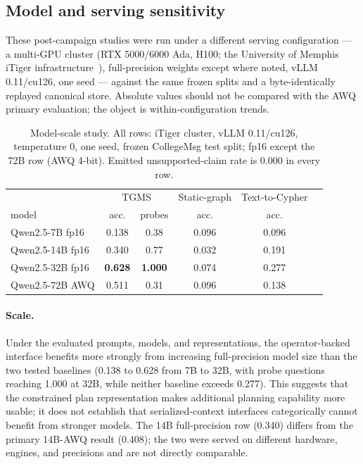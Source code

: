 \documentclass[11pt]{article}
\begin{document}
\subsection{Model and serving sensitivity}
\label{sec:sensitivity}
These post-campaign studies were run under a different serving
configuration --- a multi-GPU cluster (RTX 5000/6000 Ada, H100; the
University of Memphis iTiger infrastructure~\cite{sharif2025itiger}),
full-precision weights except where noted, vLLM 0.11/cu126, one seed
--- against the same frozen splits and a byte-identically replayed
canonical store. Absolute values should not be compared with the AWQ
primary evaluation; the object is within-configuration trends.

\begin{table}[t]
\centering\small
\caption{Model-scale study. All rows: iTiger cluster, vLLM 0.11/cu126,
temperature 0, one seed, frozen CollegeMsg test split; fp16 except the
72B row (AWQ 4-bit). Emitted unsupported-claim rate is 0.000 in every
row.}
\label{tab:scale}
\begin{tabular}{lccccc}
\toprule
 & \multicolumn{2}{c}{TGMS} & Static-graph & Text-to-Cypher \\
model & acc. & probes & acc. & acc. \\
\midrule
Qwen2.5-7B fp16 & 0.138 & 0.38 & 0.096 & 0.096 \\
Qwen2.5-14B fp16 & 0.340 & 0.77 & 0.032 & 0.191 \\
Qwen2.5-32B fp16 & \textbf{0.628} & \textbf{1.000} & 0.074 & 0.277 \\
Qwen2.5-72B AWQ & 0.511 & 0.31 & 0.096 & 0.138 \\
\bottomrule
\end{tabular}
\end{table}

\paragraph{Scale.}
Under the evaluated prompts, models, and representations, the
operator-backed interface benefits more strongly from increasing
full-precision model size than the two tested baselines (0.138 to 0.628
from 7B to 32B, with probe questions reaching 1.000 at 32B, while
neither baseline exceeds 0.277). This suggests that the constrained
plan representation makes additional planning capability more usable;
it does not establish that serialized-context interfaces categorically
cannot benefit from stronger models. The 14B full-precision row (0.340)
differs from the primary 14B-AWQ result (0.408); the two were served on
different hardware, engines, and precisions and are not directly
comparable.
\end{document}
